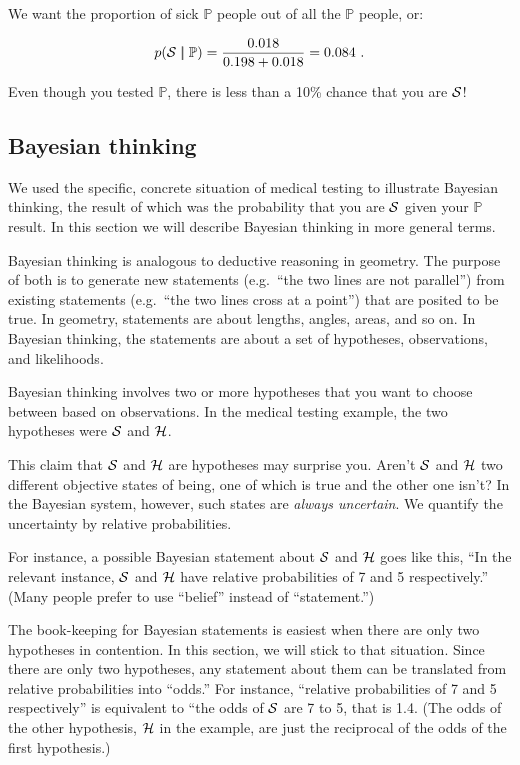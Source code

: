 \documentclass[
  letterpaper,
  DIV=11,
  numbers=noendperiod,
  oneside]{scrartcl}
\begin{document}
\begin{tcolorbox}
We want the proportion of sick \({\mathbb{P}}\) people out of all the
\({\mathbb{P}}\) people, or:

\[p({\cal S}\ |\!\!|\  {\mathbb{P}}) = \frac{0.018}{0.198 + 0.018} = 0.084\ .\]

Even though you tested \({\mathbb{P}}\), there is less than a 10\%
chance that you are \({\cal S}\)!

\end{tcolorbox}

\subsection{Bayesian thinking}\label{bayesian-thinking}

We used the specific, concrete situation of medical testing to
illustrate Bayesian thinking, the result of which was the probability
that you are \({\cal S}\) given your \({\mathbb{P}}\) result. In this
section we will describe Bayesian thinking in more general terms.

Bayesian thinking is analogous to deductive reasoning in geometry. The
purpose of both is to generate new statements (e.g.~``the two lines are
not parallel'') from existing statements (e.g.~``the two lines cross at
a point'') that are posited to be true. In geometry, statements are
about lengths, angles, areas, and so on. In Bayesian thinking, the
statements are about a set of hypotheses, observations, and likelihoods.

Bayesian thinking involves two or more hypotheses that you want to
choose between based on observations. In the medical testing example,
the two hypotheses were \({\cal S}\) and \({\cal H}\).

This claim that \({\cal S}\) and \({\cal H}\) are hypotheses may
surprise you. Aren't \({\cal S}\) and \({\cal H}\) two different
objective states of being, one of which is true and the other one isn't?
In the Bayesian system, however, such states are \emph{always
uncertain}. We quantify the uncertainty by relative probabilities.

For instance, a possible Bayesian statement about \({\cal S}\) and
\({\cal H}\) goes like this, ``In the relevant instance, \({\cal S}\)
and \({\cal H}\) have relative probabilities of 7 and 5 respectively.''
(Many people prefer to use ``belief'' instead of ``statement.'')

The book-keeping for Bayesian statements is easiest when there are only
two hypotheses in contention. In this section, we will stick to that
situation. Since there are only two hypotheses, any statement about them
can be translated from relative probabilities into ``odds.'' For
instance, ``relative probabilities of 7 and 5 respectively'' is
equivalent to ``the odds of \({\cal S}\) are 7 to 5, that is 1.4. (The
odds of the other hypothesis, \({\cal H}\) in the example, are just the
reciprocal of the odds of the first hypothesis.)
\end{document}

